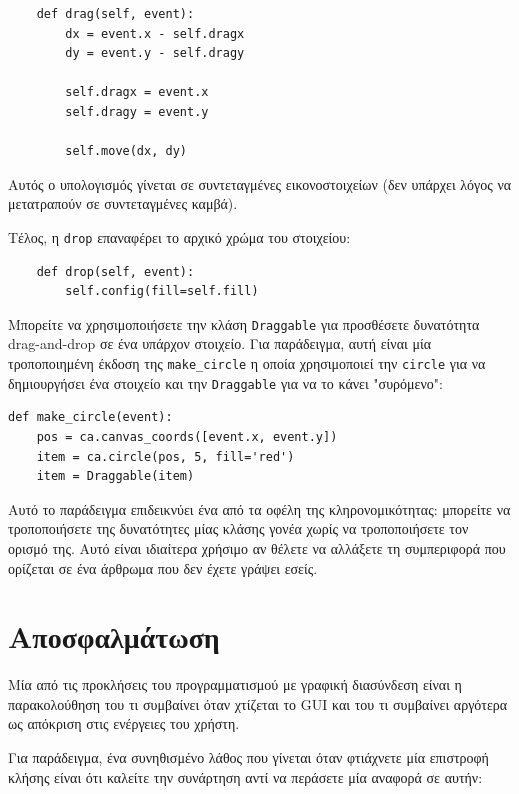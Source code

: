 \documentclass[10pt]{book}
\begin{document}
\begin{verbatim}
    def drag(self, event):
        dx = event.x - self.dragx
        dy = event.y - self.dragy

        self.dragx = event.x
        self.dragy = event.y

        self.move(dx, dy)
\end{verbatim}
%
Αυτός ο υπολογισμός γίνεται σε συντεταγμένες εικονοστοιχείων (δεν υπάρχει λόγος να μετατραπούν σε
συντεταγμένες καμβά).

Τέλος, η {\tt drop} επαναφέρει το αρχικό χρώμα του στοιχείου:

\begin{verbatim}
    def drop(self, event):
        self.config(fill=self.fill)
\end{verbatim}
%
Μπορείτε να χρησιμοποιήσετε την κλάση {\tt Draggable} για προσθέσετε δυνατότητα 
drag-and-drop σε ένα υπάρχον στοιχείο.  Για παράδειγμα, αυτή είναι μία τροποποιημένη 
έκδοση της \verb"make_circle" η οποία χρησιμοποιεί την {\tt circle} για να 
δημιουργήσει ένα στοιχείο και την {\tt Draggable} για να το κάνει "συρόμενο":

\begin{verbatim}
def make_circle(event):
    pos = ca.canvas_coords([event.x, event.y])
    item = ca.circle(pos, 5, fill='red')
    item = Draggable(item)
\end{verbatim}
%
Αυτό το παράδειγμα επιδεικνύει ένα από τα οφέλη της κληρονομικότητας:  
μπορείτε να τροποποιήσετε της δυνατότητες μίας κλάσης γονέα χωρίς να τροποποιήσετε
τον ορισμό της.  Αυτό είναι ιδιαίτερα χρήσιμο αν θέλετε να αλλάξετε τη συμπεριφορά
που ορίζεται σε ένα άρθρωμα που δεν έχετε γράψει εσείς.



\section{Αποσφαλμάτωση}

Μία από τις προκλήσεις του προγραμματισμού με γραφική διασύνδεση είναι η παρακολούθηση του τι 
συμβαίνει όταν χτίζεται το GUI και του τι συμβαίνει αργότερα ως απόκριση στις ενέργειες του χρήστη.  

Για παράδειγμα, ένα συνηθισμένο λάθος που γίνεται όταν φτιάχνετε μία επιστροφή κλήσης είναι ότι
καλείτε την συνάρτηση αντί να περάσετε μία αναφορά σε αυτήν:
\end{document}
